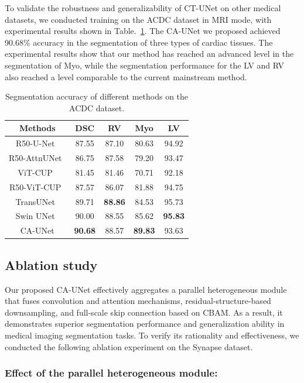 To validate the robustness and generalizability of CT-UNet on other medical datasets, we conducted training on the ACDC dataset in MRI mode, with experimental results shown in Table.~\ref{acdc}. The CA-UNet we proposed achieved 90.68\% accuracy in the segmentation of three types of cardiac tissues. The experimental results show that our method has reached an advanced level in the segmentation of Myo, while the segmentation performance for the LV and RV also reached a level comparable to the current mainstream method.
  
\begin{table}[htbp]
\caption{Segmentation accuracy of different methods on the ACDC dataset.}\label{acdc}
\begin{tabular}{c|c|ccc}
\hline
Methods & DSC& RV & Myo& LV\\
\hline
R50-U-Net~\cite{chen2021transunet} & 87.55 & 87.10 & 80.63 & 94.92\\
R50-AttnUNet~\cite{chen2021transunet} & 86.75 & 87.58 & 79.20 & 93.47\\
ViT-CUP~\cite{chen2021transunet} & 81.45 & 81.46 & 70.71 & 92.18\\
R50-ViT-CUP~\cite{chen2021transunet} & 87.57 & 86.07 & 81.88 & 94.75\\
TransUNet~\cite{chen2021transunet} & 89.71 & \textbf{88.86} & 84.53 & 95.73\\
Swin UNet~\cite{cao2022swin} & 90.00 & 88.55 & 85.62 & \textbf{95.83} \\
\hline
CA-UNet & \textbf{90.68} & 88.57 & \textbf{89.83} & 93.63 \\
\hline
\end{tabular}
\centering
\end{table}


\subsection{Ablation study}

Our proposed CA-UNet effectively aggregates a parallel heterogeneous module that fuses convolution and attention mechanisms, residual-structure-based downsampling, and full-scale skip connection based on CBAM. As a result, it demonstrates superior segmentation performance and generalization ability in medical imaging segmentation tasks. To verify its rationality and effectiveness, we conducted the following ablation experiment on the Synapse dataset.

\subsubsection{Effect of the parallel heterogeneous module:}

